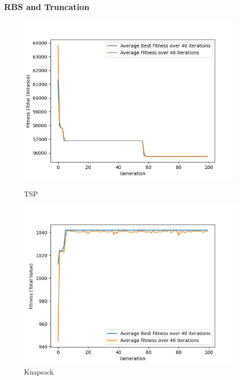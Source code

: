 \documentclass[11pt, letterpaper]{article}
\begin{document}
\subsubsection {RBS and Truncation}
\begin{figure}[H]
  \includegraphics[width=\linewidth]{images/tsp_rb_tr.png}
  \caption{TSP}
\endminipage\hfill
{}
  \includegraphics[width=\linewidth]{images/knapsack_rb_tr.png}
  \caption{Knapsack}
\endminipage\hfill
{}%

\end{figure}
\end{document}
